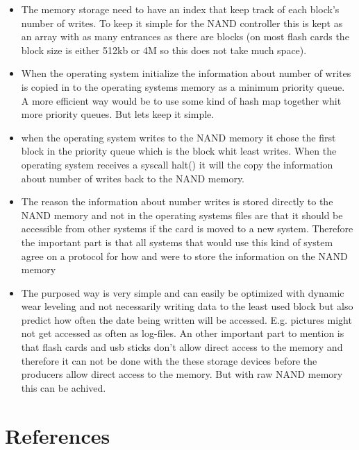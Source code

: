 \documentclass[a4paper,12pt,danish]{report}
\begin{document}
\begin{itemize}
\item The memory storage need to have an index that keep track of each block's number of writes. To keep it simple for the NAND controller this is kept as an array with as many entrances as there are blocks (on most flash cards the block size is either 512kb or 4M so this does not take much space). 

\item When the operating system initialize the information about number of writes is copied in to the operating systems memory as a minimum priority queue. A more efficient way would be to use some kind of hash map together whit more priority queues. But lets keep it simple.

\item when the operating system writes to the NAND memory it chose the first block in the priority queue which is the block whit least writes. When the operating system receives a syscall halt() it will the copy the information about number of writes back to the NAND memory.

\item The reason the information about number writes is stored directly to the NAND memory and not in the operating systems files are that it should be accessible from other systems if the card is moved to a new system. Therefore the important part is that all systems that would use this kind of system agree on a protocol for how and were to store the information on the NAND memory

\item The purposed way is very simple and can easily be optimized with dynamic wear leveling and not necessarily writing data to the least used block but also predict how often the date being written will be accessed. E.g. pictures might not get accessed as often as log-files. An other important part to mention is that flash cards and usb sticks don't allow direct access to the memory and therefore it can not be done with the these storage devices before the producers  allow direct access to the memory. But with raw NAND memory this can be achived.


\end{itemize}



\newpage
\section{References}
\subsection{}
\end{document}

